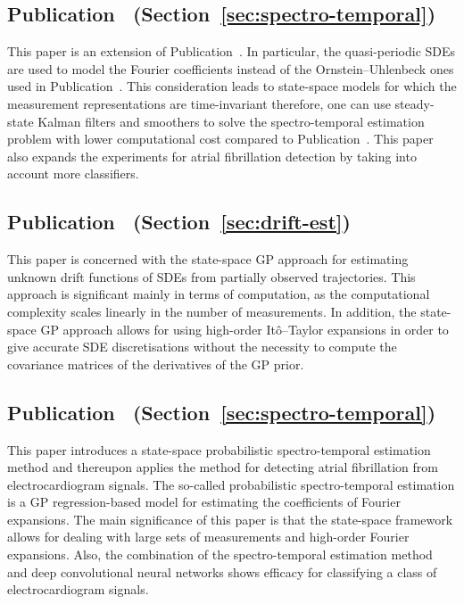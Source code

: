 \subsection*{Publication~ (Section~\ref{sec:spectro-temporal})}
This paper is an extension of Publication~. In particular, the quasi-periodic SDEs are used to model the Fourier coefficients instead of the Ornstein--Uhlenbeck ones used in Publication~. This consideration leads to state-space models for which the measurement representations are time-invariant therefore, one can use steady-state Kalman filters and smoothers to solve the spectro-temporal estimation problem with lower computational cost compared to Publication~. This paper also expands the experiments for atrial fibrillation detection by taking into account more classifiers. 

\subsection*{Publication~ (Section~\ref{sec:drift-est})}
This paper is concerned with the state-space GP approach for estimating unknown drift functions of SDEs from partially observed trajectories. This approach is significant mainly in terms of computation, as the computational complexity scales linearly in the number of measurements. In addition, the state-space GP approach allows for using high-order It\^{o}--Taylor expansions in order to give accurate SDE discretisations without the necessity to compute the covariance matrices of the derivatives of the GP prior.

\subsection*{Publication~ (Section~\ref{sec:spectro-temporal})}
This paper introduces a state-space probabilistic spectro-temporal estimation method and thereupon applies the method for detecting atrial fibrillation from electrocardiogram signals. The so-called probabilistic spectro-temporal estimation is a GP regression-based model for estimating the coefficients of Fourier expansions. The main significance of this paper is that the state-space framework allows for dealing with large sets of measurements and high-order Fourier expansions. Also, the combination of the spectro-temporal estimation method and deep convolutional neural networks shows efficacy for classifying a class of electrocardiogram signals.

